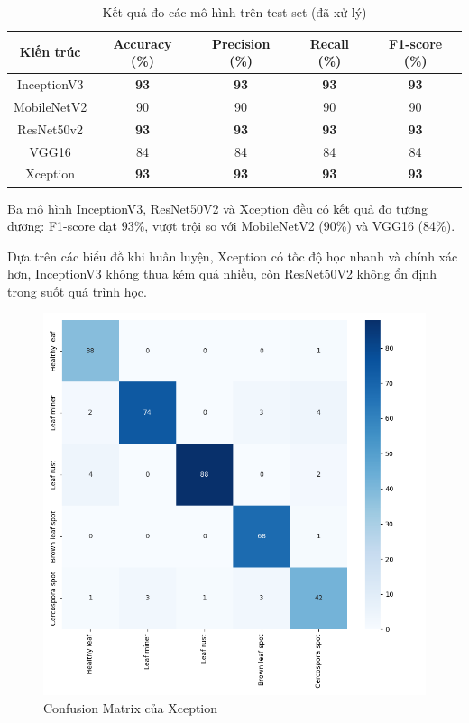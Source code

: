 \documentclass[a4paper,14pt]{extarticle}
\begin{document}
		\begin{table}[H]
			\centering
			\begin{tabular}{|c|c|c|c|c|}
				\hline
				Kiến trúc   & Accuracy (\%) & Precision (\%) & Recall (\%) & F1-score (\%)    \\ \hline
				InceptionV3 & \textbf{93}   & \textbf{93}    & \textbf{93} & \textbf{93} \\
				MobileNetV2 & 90            & 90             & 90          & 90          \\
				ResNet50v2  & \textbf{93}   & \textbf{93}    & \textbf{93} & \textbf{93} \\
				VGG16       & 84            & 84             & 84          & 84          \\
				Xception    & \textbf{93}   & \textbf{93}    & \textbf{93} & \textbf{93} \\ \hline
			\end{tabular}
			\caption{Kết quả đo các mô hình trên test set (đã xử lý)}
		\end{table}
		
		Ba mô hình InceptionV3, ResNet50V2 và Xception đều có kết quả đo tương đương: F1-score đạt 93\%, vượt trội so với MobileNetV2 (90\%) và VGG16 (84\%).
		
		Dựa trên các biểu đồ khi huấn luyện, Xception có tốc độ học nhanh và chính xác hơn, InceptionV3 không thua kém quá nhiều, còn ResNet50V2 không ổn định trong suốt quá trình học.

		\begin{figure}[H]
			\centering
			\includegraphics[scale=0.5]{images/xception_matrix.png}
			\caption{Confusion Matrix của Xception}
		\end{figure}
\end{document}
